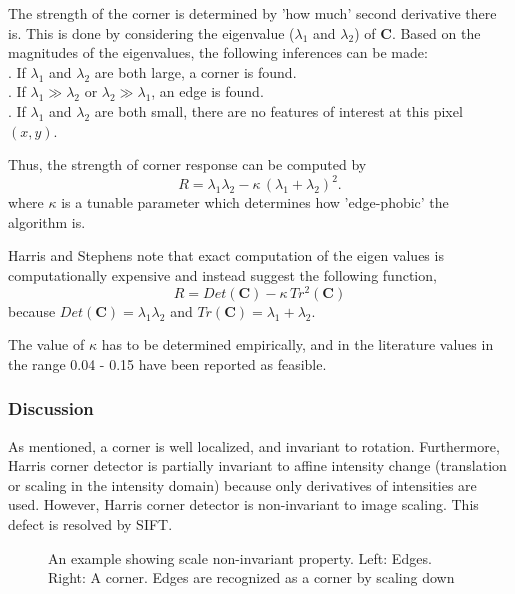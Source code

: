 \documentclass{article}
\begin{document}
The strength of the corner is determined by 'how much' second derivative there is. 
This is done by considering the eigenvalue ($ \lambda_1 $ and $ \lambda_2 $) of $ \mathbf{C} $. 
Based on the magnitudes of the eigenvalues, the following inferences can be made: \\
. If $\lambda_1$ and $\lambda_2$ are both large, a corner is found. \\
. If $\lambda_1 \gg \lambda_2 $ or $ \lambda_2 \gg \lambda_1 $, an edge is found. \\
. If $\lambda_1$ and $\lambda_2$ are both small, there are no features of interest at this pixel $(x,y)$.

Thus, the strength of corner response can be computed by
\begin{equation}
  R = \lambda_1 \lambda_2 - \kappa \, (\lambda_1 + \lambda_2)^2.
\end{equation}
where $\kappa$ is a tunable parameter which determines how 'edge-phobic' the algorithm is.

Harris and Stephens note that exact computation of the eigen values is computationally expensive and instead suggest the
following function, 
\begin{equation}
  R = Det(\mathbf{C}) - \kappa \, Tr^2(\mathbf{C})
\end{equation}
because $ Det(\mathbf{C}) = \lambda_1 \lambda_2 $ and $ Tr(\mathbf{C}) = \lambda_1 + \lambda_2 .$

The value of $\kappa$ has to be determined empirically, and in the literature values in the range 0.04 - 0.15 have been reported as feasible.

\subsubsection{Discussion}

As mentioned, a corner is well localized, and invariant to rotation. 
Furthermore, Harris corner detector is partially invariant to affine intensity change (translation or scaling in the intensity domain) because only derivatives of intensities are used. 
However, Harris corner detector is non-invariant to image scaling. 
This defect is resolved by SIFT. 

\begin{figure}[ht]
  \begin{center}
  \end{center}
  \caption{An example showing scale non-invariant property. Left: Edges. Right: A corner. Edges are recognized as a corner by scaling down}
  \label{fig:HarrisScaleVariant}
\end{figure}
\end{document}
